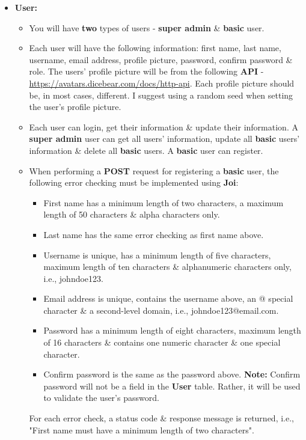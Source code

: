 \documentclass{article}
\begin{document}
\begin{itemize}
	\item \textbf{User:}
	\begin{itemize}
		\item You will have \textbf{two} types of users - \textbf{super admin} \& \textbf{basic} user.
		\item Each user will have the following information: first name, last name, username, email address, profile picture, password, confirm password \& role. The users' profile picture will be from the following \textbf{API} - \href{https://avatars.dicebear.com/docs/http-api}{https://avatars.dicebear.com/docs/http-api}. Each profile picture should be, in most cases, different. I suggest using a random seed when setting the user's profile picture.
		\item Each user can login, get their information \& update their information. A \textbf{super admin} user can get all users' information, update all \textbf{basic} users' information \& delete all \textbf{basic} users. A \textbf{basic} user can register.
		\item When performing a \textbf{POST} request for registering a \textbf{basic} user, the following error checking must be implemented using \textbf{Joi}:
		\begin{itemize}
			\item First name has a minimum length of two characters, a maximum length of 50 characters \& alpha characters only.
			\item Last name has the same error checking as first name above.
			\item Username is unique, has a minimum length of five characters, maximum length of ten characters \& alphanumeric characters only, i.e., johndoe123.
			\item Email address is unique, contains the username above, an @ special character \& a second-level domain, i.e., johndoe123@email.com.
			\item Password has a minimum length of eight characters, maximum length of 16 characters \& contains one numeric character \& one special character.
			\item Confirm password is the same as the password above. \textbf{Note:} Confirm password will not be a field in the \textbf{User} table. Rather, it will be used to validate the user's password.
		\end{itemize}
		For each error check, a status code \& response message is returned, i.e., "First name must have a minimum length of two characters".

\end{itemize}
\end{itemize}
\end{document}
